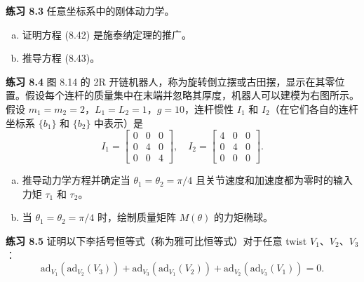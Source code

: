 \documentclass[12pt,a4paper]{article}
\begin{document}
\textbf{练习 8.3} 任意坐标系中的刚体动力学。
\begin{enumerate}[(a)]
\item 证明方程 (8.42) 是施泰纳定理的推广。
\item 推导方程 (8.43)。
\end{enumerate}

\textbf{练习 8.4} 图 8.14 的 2R 开链机器人，称为旋转倒立摆或古田摆，显示在其零位置。假设每个连杆的质量集中在末端并忽略其厚度，机器人可以建模为右图所示。假设 $m_1 = m_2 = 2$，$L_1 = L_2 = 1$，$g = 10$，连杆惯性 $I_1$ 和 $I_2$（在它们各自的连杆坐标系 $\{b_1\}$ 和 $\{b_2\}$ 中表示）是
\begin{equation}
I_1 = \begin{bmatrix} 0 & 0 & 0 \\ 0 & 4 & 0 \\ 0 & 0 & 4 \end{bmatrix}, \quad I_2 = \begin{bmatrix} 4 & 0 & 0 \\ 0 & 4 & 0 \\ 0 & 0 & 0 \end{bmatrix}.
\end{equation}
\begin{enumerate}[(a)]
\item 推导动力学方程并确定当 $\theta_1 = \theta_2 = \pi/4$ 且关节速度和加速度都为零时的输入力矩 $\tau_1$ 和 $\tau_2$。
\item 当 $\theta_1 = \theta_2 = \pi/4$ 时，绘制质量矩阵 $M(\theta)$ 的力矩椭球。
\end{enumerate}

\textbf{练习 8.5} 证明以下李括号恒等式（称为雅可比恒等式）对于任意 twist $V_1$、$V_2$、$V_3$：
\begin{equation}
\text{ad}_{V_1}(\text{ad}_{V_2}(V_3)) + \text{ad}_{V_3}(\text{ad}_{V_1}(V_2)) + \text{ad}_{V_2}(\text{ad}_{V_3}(V_1)) = 0.
\end{equation}
\end{document}
